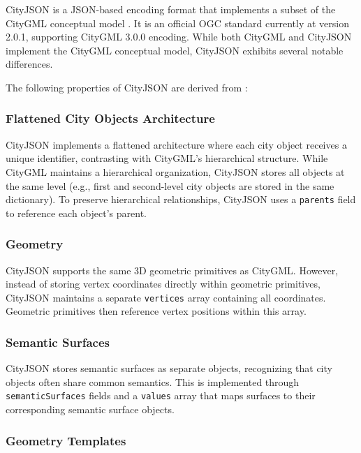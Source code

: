 CityJSON is a JSON-based \citep{json} encoding format that implements a subset of the CityGML conceptual model \citep{CityGML}. It is an official OGC standard \citep{ogc} currently at version 2.0.1, supporting CityGML 3.0.0 encoding. While both CityGML and CityJSON implement the CityGML conceptual model, CityJSON exhibits several notable differences.

The following properties of CityJSON are derived from \citet{ledoux_2019}:


\subsubsection{Flattened City Objects Architecture}
\label{rw:cityjson:flattened_architecture}

CityJSON implements a flattened architecture where each city object receives a unique identifier, contrasting with CityGML's hierarchical structure. While CityGML maintains a hierarchical organization, CityJSON stores all objects at the same level (e.g., first and second-level city objects are stored in the same dictionary). To preserve hierarchical relationships, CityJSON uses a \texttt{parents} field to reference each object's parent.

\subsubsection{Geometry}
\label{rw:cityjson:geometry}

CityJSON supports the same 3D geometric primitives as CityGML. However, instead of storing vertex coordinates directly within geometric primitives, CityJSON maintains a separate \texttt{vertices} array containing all coordinates. Geometric primitives then reference vertex positions within this array.

\subsubsection{Semantic Surfaces}
\label{rw:cityjson:semantic_surfaces}

CityJSON stores semantic surfaces as separate objects, recognizing that city objects often share common semantics. This is implemented through \texttt{semanticSurfaces} fields and a \texttt{values} array that maps surfaces to their corresponding semantic surface objects.

\subsubsection{Geometry Templates}
\label{rw:cityjson:geometry_templates}

